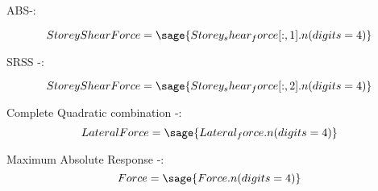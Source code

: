 \documentclass[12pt]{report}
\begin{document}
ABS-:

\begin{equation}
	Storey Shear Force=\sage{Storey_shear_force[:,1].n(digits=4)}
\end{equation}

SRSS -:

\begin{equation}
	Storey Shear Force=\sage{Storey_shear_force[:,2].n(digits=4)}
\end{equation}

Complete Quadratic combination -:
\begin{equation}
	Lateral Force =\sage{Lateral_force.n(digits=4)}
\end{equation}

Maximum Absolute Response -:
\begin{equation}
	Force =\sage{Force.n(digits=4)}
\end{equation}
\end{document}
